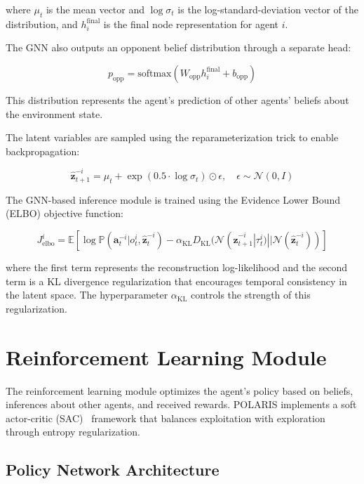 \documentclass[a4paper,12pt]{report}
\begin{document}
where $\mu_{t}$ is the mean vector and $\log\sigma_{t}$ is the log-standard-deviation vector of the distribution, and $h^{\text{final}}_i$ is the final node representation for agent $i$.

The GNN also outputs an opponent belief distribution through a separate head:

\begin{equation}
    p_{\text{opp}} = \text{softmax}(W_{\text{opp}}h^{\text{final}}_i + b_{\text{opp}})
\end{equation}

This distribution represents the agent's prediction of other agents' beliefs about the environment state.

The latent variables are sampled using the reparameterization trick to enable backpropagation:

\begin{equation}
    \hat{\boldsymbol{z}}^{-i}_{t+1} = \mu_{t} + \exp(0.5 \cdot \log\sigma_{t}) \odot \epsilon, \quad \epsilon \sim \mathcal{N}(0, I)
\end{equation}

The GNN-based inference module is trained using the Evidence Lower Bound (ELBO) objective function:

\begin{equation}
    J^{i}_{\text{elbo}} = \mathbb{E}[\log \mathbb{P}(\boldsymbol{a}^{-i}_{t}|o^{i}_{t}, \hat{\boldsymbol{z}}^{-i}_{t}) - \alpha_{\text{KL}}D_{\text{KL}}(\mathcal{N}(\hat{\boldsymbol{z}}^{-i}_{t+1}|\tau^i_t) || \mathcal{N}(\hat{\boldsymbol{z}}^{-i}_{t}))]
\end{equation}

where the first term represents the reconstruction log-likelihood and the second term is a KL divergence regularization that encourages temporal consistency in the latent space. The hyperparameter $\alpha_{\text{KL}}$ controls the strength of this regularization.


\section{Reinforcement Learning Module}

The reinforcement learning module optimizes the agent's policy based on beliefs, inferences about other agents, and received rewards. POLARIS implements a soft actor-critic (SAC)~\cite{haarnoja2018soft} framework that balances exploitation with exploration through entropy regularization.

\subsection{Policy Network Architecture}
\end{document}
